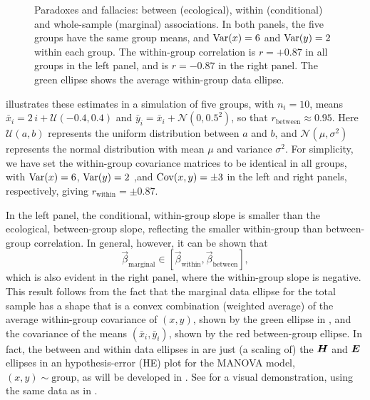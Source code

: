 \begin{figure}[htb]
\begin{minipage}[b]{.49\linewidth}
 \end{minipage}
  \caption{Paradoxes and fallacies: between (ecological), within (conditional) and whole-sample (marginal) associations.
  In both panels, the five groups have the same group means, and $\mathrm{Var}(x)=6$ and $\mathrm{Var}(y)=2$ within each group.
  The within-group correlation is $r = +0.87$ in all groups in the left panel, and is $r = -0.87$ in the right panel.
  The green ellipse shows the average within-group data ellipse.}
  \label{fig:between-within}
\end{figure}

 illustrates these estimates in a simulation of five groups, with $n_i=10$,  means
$\bar{x}_i = 2 \, i + \mathcal{U}(-0.4, 0.4)$  and
$\bar{y}_i = \bar{x}_i + \mathcal{N}(0, 0.5^2)$, 
so that $r_{\textrm{between}} \approx 0.95$.
Here $\mathcal{U}(a,b)$ represents the uniform distribution between $a$ and $b$, and
$\mathcal{N}(\mu,\sigma^2)$ represents the normal distribution with mean $\mu$ and 
variance $\sigma^2$.
For simplicity, we have set the within-group covariance matrices to be identical in all groups, with
$\mathrm{Var}(x)=6$, $\mathrm{Var}(y)=2$ ,and $\mathrm{Cov}(x,y)=\pm 3$ in the left and right panels, respectively, giving
$r_{\textrm{within}} = \pm 0.87$.

In the left panel, the conditional, within-group slope is smaller than the ecological, between-group slope,
reflecting the smaller within-group than between-group correlation.
In general, however, it can be shown that
\begin{equation*}
\vec{\beta}_{\textrm{marginal}} \in [\vec{\beta}_{\textrm{within}} , \vec{\beta}_{\textrm{between}} ] \comma
\end{equation*}
which is also evident in the right panel, where the within-group slope is negative.
This result follows from the fact that the marginal data ellipse for the total sample
has a shape that is a convex combination (weighted average) of the average within-group
covariance of $(x, y)$, shown by the green ellipse in  ,
and the  covariance of the means $(\bar{x}_i, \bar{y}_i)$, shown by the red between-group ellipse.
In fact, the between and within data ellipses in  
are just (a scaling of) the $\bm{H}$ and $\bm{E}$ ellipses in an hypothesis-error (HE) plot for the
MANOVA model, $(x, y) \sim \textrm{group}$, as will be developed in .
See  for a visual demonstration, using the same data  as in   .

